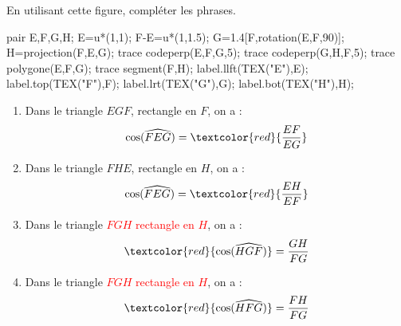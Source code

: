     En utilisant cette figure, compléter les phrases.

    \begin{Geometrie}
        pair E,F,G,H;
        E=u*(1,1);
        F-E=u*(1,1.5);
        G=1.4[F,rotation(E,F,90)];
        H=projection(F,E,G);
        trace codeperp(E,F,G,5);
        trace codeperp(G,H,F,5);
        trace polygone(E,F,G);
        trace segment(F,H);
        label.llft(TEX("E"),E);
        label.top(TEX("F"),F);
        label.lrt(TEX("G"),G);
        label.bot(TEX("H"),H);
    \end{Geometrie}

    \begin{enumerate}
        \item Dans le triangle $EGF$, rectangle en $F$, on a : $$\text{cos}(\widehat{FEG})=\textcolor{red}{\dfrac{EF}{EG}}$$
        \item Dans le triangle $FHE$, rectangle en $H$, on a : $$\text{cos}(\widehat{FEG})=\textcolor{red}{\dfrac{EH}{EF}}$$
        \item Dans le triangle \textcolor{red}{$FGH$ rectangle en $H$}, on a : $$\textcolor{red}{\text{cos}(\widehat{HGF})}=\dfrac{GH}{FG}$$
        \item Dans le triangle \textcolor{red}{$FGH$ rectangle en $H$}, on a : $$\textcolor{red}{\text{cos}(\widehat{HFG})}=\dfrac{FH}{FG}$$
    \end{enumerate}
